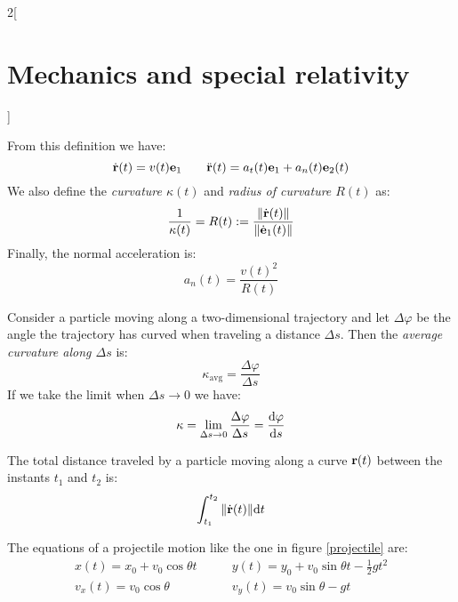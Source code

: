 \documentclass[../../../main.tex]{subfiles}
\begin{document}
\begin{multicols}{2}[\section{Mechanics and special relativity}]
\begin{definition}
    From this definition we have: $$\dot{\vb{r}}(t)=v(t)\vb{e}_1\qquad\ddot{\vb{r}}(t)=a_t(t)\vb{e}_1+a_n(t)\vb{e}_2(t)$$ We also define the \textit{curvature $\kappa(t)$} and \textit{radius of curvature $R(t)$} as: $$\frac{1}{\kappa(t)}=R(t):=\frac{\|\dot{\vb{r}}(t)\|}{\|\dot{\vb{e}}_1(t)\|}$$ Finally, the normal acceleration is: $$a_n(t)=\frac{v(t)^2}{R(t)}$$
  \end{definition}
  \begin{prop}[Curvature]
    Consider a particle moving along a two-dimensional trajectory and let $\Delta\varphi$ be the angle the trajectory has curved when traveling a distance $\Delta s$. Then the \textit{average curvature along $\Delta s$} is: $$\kappa_\text{avg}=\frac{\Delta \varphi}{\Delta s}$$ If we take the limit when $\Delta s\to 0$ we have: $$\kappa=\lim_{\Delta s\to 0}\frac{\Delta \varphi}{\Delta s}=\dv{\varphi}{s}$$
  \end{prop}
  \begin{prop}
    The total distance traveled by a particle moving along a curve $\vb{r}(t)$ between the instants $t_1$ and $t_2$ is: $$\int_{t_1}^{t_2}\|\dot{\vb{r}}(t)\|\dd t$$
  \end{prop}
  \begin{prop}
    The equations of a projectile motion like the one in figure \ref{projectile} are:
    \begin{align*}
      x(t)=x_0+v_0\cos\theta t\quad & \quad y(t)=y_0+v_0\sin\theta t-\frac{1}{2}gt^2 \\
      v_x(t)=v_0\cos\theta\quad     & \quad v_y(t)=v_0\sin\theta-gt
    \end{align*}
    \begin{center}
      \begin{minipage}{\linewidth}
        \centering
        
        \label{projectile}
      \end{minipage}
    \end{center}
  \end{prop}

\end{multicols}
\end{document}
